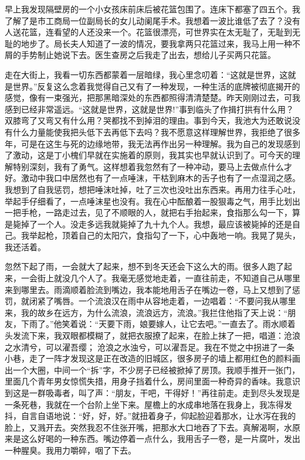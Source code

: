 \documentclass[12pt,oneside]{book}
\begin{document}
早上我发现隔壁房的一个小女孩床前床后被花篮包围了。连床下都塞了四五个。我了解了是市工商局一位副局长的女儿动阑尾手术。我想着一波比谁低了去了？没有人送花篮，连看望的人还没来一个。花篮很漂亮，可世界实在太无耻了，无耻到无耻的地步了。局长夫人知道了一波的情况，要我拿两只花篮过来，我马上用一种不屑的手势制止她说下去。医生查房之后我走了出去，想给儿子买两只花篮。

走在大街上，我看一切东西都蒙着一层暗绿，我心里念叨着：``这就是世界，这就是世界。''反复这么念着我觉得自己又有了一种发现，一种生活的底牌被彻底揭开的感觉，像有一束强光，把那黑暗深处的东西都照得清清楚楚。昨天刚刚过去，可我感到已经非常遥远。``这就是世界，这就是世界!''事到临头了作揖打拱有什么用？双膝弯了又弯又有什么用？哭都找不到掉泪的理由。事到今天，我池大为还敢说没有什么力量能使我把头低下去再低下去吗？我不愿意这样理解世界，我拒绝了很多年，可是在这生与死的边缘地带，我无法再作出另一种理解。我为自己的发现感到了激动，这是丁小槐们早就在实施着的原则，我其实也早就认识到了。可今天的理解特别深刻，我有了勇气。这样想着我忽然有了一种冲动，要马上去做点什么才好。激动中我口中居然也有了一点唾沫，干枯到麻木的舌子也有了一点湿润之感。我想到了自我惩罚，想把唾沫吐掉，吐了三次也没吐出东西来。再用力往手心吐，举起手仔细看了，一点唾沫星也没有。我在心中酝酿着一股狠毒之气，用手比划出一把手枪，一路走过去，见了不顺眼的人，就把右手抬起来，食指那么勾一下，算是毙掉了一个人。没走多远我就毙掉了九十九个人。我想，最应该被毙掉的还是自己。我举起枪，顶着自己的太阳穴，食指勾了一下，心中轰地一响。我晃了晃头，我还活着。

忽然下起了雨，一会就大了起来，想不到冬天还会下这么大的雨。很多人跑了起来，一会街上就没几个人了。我毫无感觉地走着，一直往前走，不知道自己从哪里来到哪里去。雨滴顺着脸流到嘴边，我本能地用舌子在嘴边一卷，马上又想到了惩罚，就闭紧了嘴唇。一个流浪汉在雨中从容地走着，一边唱着：``不要问我从哪里来，我的故乡在远方，为什么流浪，流浪远方，流浪。''我拦住他指了天上说：``朋友，下雨了。''他笑着说：``天要下雨，娘要嫁人，让它去吧。''一直去了。雨水顺着头发流下来，我双眼都模糊了，就把衣服撩了起来，在脸上抹了一把，唱道：沧浪之水清兮，可以濯吾缨；沧浪之水浊兮，可以濯吾足。我在不觉之中拐进了一条小巷，走了一阵才发现这是正在改造的旧城区，很多房子的墙上都用红色的颜料画出一个大圈，中间一个``拆''字，不少房子已经被掀掉了房顶。我顺手推开一张门，里面几个青年男女惊慌失措，用身子挡着什么，房间里面一种奇异的香味。我意识到这是一群吸毒者，叫了声：``朋友，干吧，干得好！''再往前走。走到尽头发现是一条死巷，我就在一个台阶上坐下来。屋檐上的水成串地落在我身上，我冻得发抖，自言自语地说：``好，好，好。''就扭着身子，仰起脸迎着那水，让水泻在我的脸上，又溅开去。突然我忍不住张开嘴，把那水大口地吞了下去。真解渴啊，水原来是这么好喝的一种东西。嘴边停着一点什么，我用舌子一卷，是一片腐叶，发出一种腥臭。我用力嚼碎，咽了下去。
\end{document}
